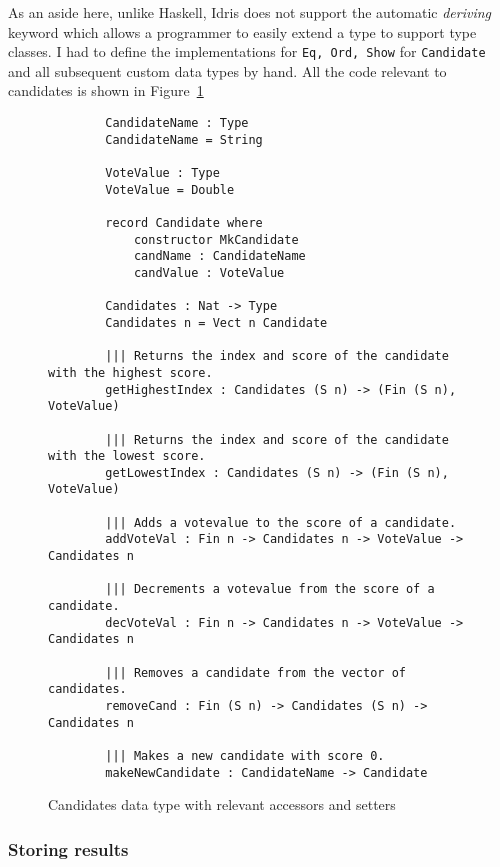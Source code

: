 As an aside here, unlike Haskell, Idris does not support the automatic
\textit{deriving} keyword which allows a programmer to easily extend a type to
support type classes. I had to define the implementations for \texttt{Eq, Ord,
	Show} for \texttt{Candidate} and all subsequent custom data types by hand. All
the code relevant to candidates is shown in Figure~\ref{candidates_code}

\begin{figure}[htbp!!!!!!!!!!!!!!]
	\caption{Candidates data type with relevant accessors and setters}
	\label{candidates_code}
	\begin{lstlisting}
        CandidateName : Type
        CandidateName = String

        VoteValue : Type
        VoteValue = Double

        record Candidate where
            constructor MkCandidate
            candName : CandidateName
            candValue : VoteValue
        
        Candidates : Nat -> Type
        Candidates n = Vect n Candidate

        ||| Returns the index and score of the candidate with the highest score. 
        getHighestIndex : Candidates (S n) -> (Fin (S n), VoteValue)

        ||| Returns the index and score of the candidate with the lowest score. 
        getLowestIndex : Candidates (S n) -> (Fin (S n), VoteValue)

        ||| Adds a votevalue to the score of a candidate. 
        addVoteVal : Fin n -> Candidates n -> VoteValue -> Candidates n
        
        ||| Decrements a votevalue from the score of a candidate. 
        decVoteVal : Fin n -> Candidates n -> VoteValue -> Candidates n

        ||| Removes a candidate from the vector of candidates. 
        removeCand : Fin (S n) -> Candidates (S n) -> Candidates n

        ||| Makes a new candidate with score 0. 
        makeNewCandidate : CandidateName -> Candidate
    \end{lstlisting}
\end{figure}

\subsubsection{Storing results}

